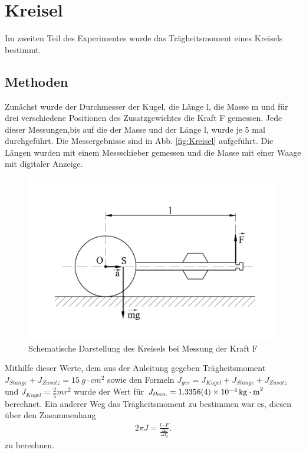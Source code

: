 \section{Kreisel}
Im zweiten Teil des Experimentes wurde das Trägheitsmoment eines Kreisels bestimmt.
\subsection{Methoden}\label{kap:KreiselMethoden}
Zunächst wurde der Durchmesser der Kugel, die Länge l, die Masse m und für drei verschiedene Positionen des Zusatzgewichtes die Kraft F gemessen.
Jede dieser Messungen,bis auf die der Masse und der Länge l, wurde je 5 mal durchgeführt. Die Messergebnisse sind in Abb. \ref{fig:Kreisel} aufgeführt.
Die Längen  wurden mit einem Messschieber gemessen und die Masse mit einer Waage mit digitaler Anzeige.
\begin{figure}[h]
	\centering
	\includegraphics[width=\linewidth]{res/KreiselAufbau.pdf}
	\caption{Schematische Darstellung des Kreisels bei Messung der Kraft F\cite{lw}}
	\label{fig:kreisel}
\end{figure}
Mithilfe dieser Werte, dem aus der Anleitung gegeben Trägheitsmoment $J_{Stange}+J_{Zusatz}=\SI{15}{g \cdot cm^2}$ sowie den Formeln $J_{ges}=J_{Kugel}+J_{Stange}+J_{Zusatz}$ und $J_{Kugel}=\frac{2}{5}mr^2$ wurde der %
Wert für $J_{theo.}=\SI{1,3356+-0,0004e-4}{kg \cdot m^2}$ berechnet. Ein anderer Weg das Trägheitsmoment zu bestimmen war es, diesen über den Zusammenhang 
\begin{align}
2 \pi J= \frac{l \cdot F}{\frac{\Delta \omega}{\Delta T_p}} \label{eq:zusJlF}.
\end{align}
zu berechnen.
